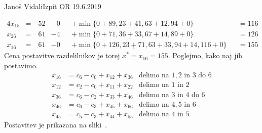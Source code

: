 \begin{naloga}{Janoš Vidali}{Izpit OR 19.6.2019}
\begin{odgovor}
\begin{enumerate}[(a)]
\begin{alignat*}{4}
x_{15} &=\ &{} 52 &-  0 &&+ \min\{0+89, \underline{23+41}, 63+12, 94+0\} &&= 116 \\
x_{26} &=\ &{} 61 &-  4 &&+ \min\{0+71, \underline{36+33}, 67+14, 89+0\} &&= 126 \\
x_{16} &=\ &{} 61 &-  0 &&+ \min\{0+126, \underline{23+71}, 63+33, 94+14, 116+0\} &&= 155
\end{alignat*}
Cena postavitve razdelilnikov je torej $x^* = x_{16} = 155$.
Poglejmo, kako naj jih postavimo.
\begin{align*}
x_{16} &= c_6 - c_0 + x_{12} + x_{36} & \text{delimo na $1, 2$ in $3$ do $6$} \\
x_{12} &= c_2 - c_0 + x_{11} + x_{22} & \text{delimo na $1$ in $2$} \\
x_{36} &= c_6 - c_2 + x_{33} + x_{46} & \text{delimo na $3$ in $4$ do $6$} \\
x_{46} &= c_6 - c_3 + x_{45} + x_{66} & \text{delimo na $4, 5$ in $6$} \\
x_{45} &= c_5 - c_3 + x_{44} + x_{55} & \text{delimo na $4$ in $5$}
\end{align*}
%
Postavitev je prikazana na sliki~.
\begin{slika}
\end{slika}
\end{enumerate}
\end{odgovor}
\end{naloga}
